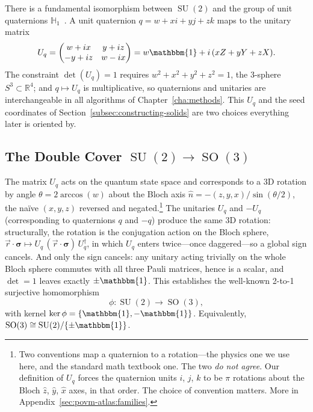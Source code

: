 \documentclass[11pt, oneside, openany]{scrbook}
\DeclareMathOperator{\SU}{SU}
\DeclareMathOperator{\SO}{SO}
\newcommand{\Id}{\mathbbm{1}}
\newcommand{\sigmavec}{\boldsymbol{\sigma}}
\begin{document}
There is a fundamental isomorphism between $\SU(2)$ and the group of unit quaternions $\mathbb{H}_1$~\cite{stillwell2008naivelietheory}. A unit quaternion $q = w + xi + yj + zk$ maps to the unitary matrix
$$
U_q = \begin{pmatrix} w + ix & y + iz \\ -y + iz & w - ix \end{pmatrix} = w\Id + i\,(xZ + yY + zX).
$$
The constraint $\det(U_q) = 1$ requires $w^2 + x^2 + y^2 + z^2 = 1$, the 3-sphere $S^3 \subset \mathbb{R}^4$; and $q \mapsto U_q$ is multiplicative, so quaternions and unitaries are interchangeable in all algorithms of Chapter~\ref{cha:methods}. This $U_q$ and the seed coordinates of Section~\ref{subsec:constructing-solids} are two choices everything later is oriented by.

\subsection{The Double Cover \texorpdfstring{$\SU(2) \to \SO(3)$}{SU(2) → SO(3)}} \label{subsec:double-cover}

The matrix $U_q$ acts on the quantum state space and corresponds to a 3D rotation by angle $\theta = 2\arccos(w)$ about the Bloch axis $\hat n = -(z, y, x) / \sin(\theta/2)$, the na\"ive $(x, y, z)$ reversed and negated.\footnote{Two conventions map a quaternion to a rotation---the physics one we use here, and the standard math textbook one. The two \textit{do not agree}. Our definition of $U_q$ forces the quaternion units $i$, $j$, $k$ to be $\pi$ rotations about the Bloch $\hat z$, $\hat y$, $\hat x$ axes, in that order. The choice of convention matters. More in Appendix~\ref{sec:povm-atlas:families}.} The unitaries $U_q$ and $-U_q$ (corresponding to quaternions $q$ and $-q$) produce the same 3D rotation: structurally, the rotation is the conjugation action on the Bloch sphere, $\vec r \cdot \sigmavec \mapsto U_q\,(\vec r \cdot \sigmavec)\,U_q^\dagger$, in which $U_q$ enters twice---once daggered---so a global sign cancels. And only the sign cancels: any unitary acting trivially on the whole Bloch sphere commutes with all three Pauli matrices, hence is a scalar, and $\det = 1$ leaves exactly $\pm\Id$. This establishes the well-known 2-to-1 surjective homomorphism
$$ \phi: \SU(2) \to \SO(3), $$
with kernel $\ker\phi = \{\Id, -\Id\}$. Equivalently, $\SO(3) \cong \SU(2)/\{\pm\Id\}$.
\end{document}
